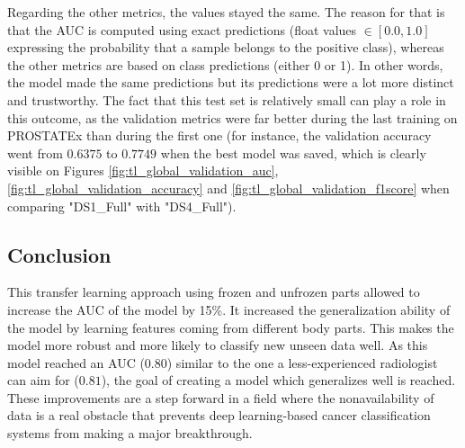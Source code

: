 Regarding the other metrics, the values stayed the same. The reason for that is that the AUC is computed using exact predictions (float values $\in [0.0,1.0]$ expressing the probability that a sample belongs to the positive class), whereas the other metrics are based on class predictions (either 0 or 1). In other words, the model made the same predictions but its predictions were a lot more distinct and trustworthy. The fact that this test set is relatively small can play a role in this outcome, as the validation metrics were far better during the last training on PROSTATEx than during the first one (for instance, the validation accuracy went from $0.6375$ to $0.7749$ when the best model was saved, which is clearly visible on Figures \ref{fig:tl_global_validation_auc}, \ref{fig:tl_global_validation_accuracy} and \ref{fig:tl_global_validation_f1score} when comparing "DS1{\_}Full" with "DS4{\_}Full"). 



\subsection{Conclusion}
\setlength{\marginparwidth}{3cm}\leavevmode {}This transfer learning approach using frozen and unfrozen parts allowed to increase the AUC of the model by 15\%. It increased the generalization ability of the model by learning features coming from different body parts. This makes the model more robust and more likely to classify new unseen data well. As this model reached an AUC ($0.80$) similar to the one a less-experienced radiologist can aim for ($0.81$), the goal of creating a model which generalizes well is reached. These improvements are a step forward in a field where the nonavailability of data is a real obstacle that prevents deep learning-based cancer classification systems from making a major breakthrough. 

